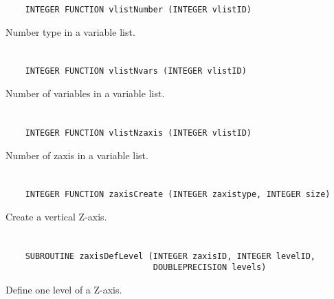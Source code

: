 \begin{verbatim}
    INTEGER FUNCTION vlistNumber (INTEGER vlistID)
\end{verbatim}

Number type in a variable list.


\section*{\tt {}}

\begin{verbatim}
    INTEGER FUNCTION vlistNvars (INTEGER vlistID)
\end{verbatim}

Number of variables in a variable list.


\section*{\tt {}}

\begin{verbatim}
    INTEGER FUNCTION vlistNzaxis (INTEGER vlistID)
\end{verbatim}

Number of zaxis in a variable list.


\section*{\tt {}}

\begin{verbatim}
    INTEGER FUNCTION zaxisCreate (INTEGER zaxistype, INTEGER size)
\end{verbatim}

Create a vertical Z-axis.


\section*{\tt {}}

\begin{verbatim}
    SUBROUTINE zaxisDefLevel (INTEGER zaxisID, INTEGER levelID,
                              DOUBLEPRECISION levels)
\end{verbatim}

Define one level of a Z-axis.


\section*{\tt {}}

